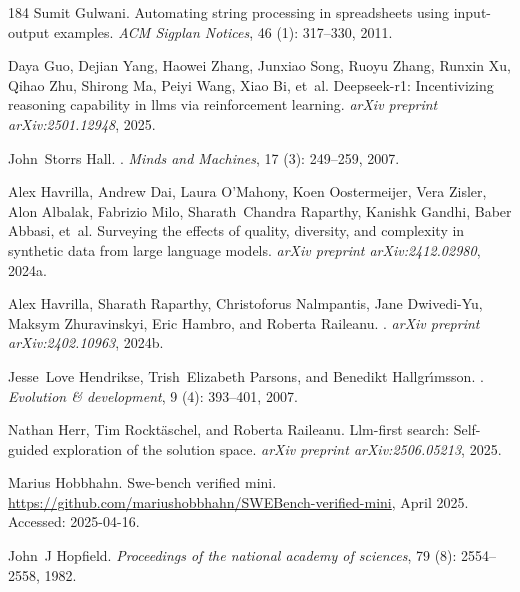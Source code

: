 \begin{thebibliography}{184}
Sumit Gulwani.
\newblock Automating string processing in spreadsheets using input-output
  examples.
\newblock \emph{ACM Sigplan Notices}, 46 (1): 317--330, 2011.

Daya Guo, Dejian Yang, Haowei Zhang, Junxiao Song, Ruoyu Zhang, Runxin Xu,
  Qihao Zhu, Shirong Ma, Peiyi Wang, Xiao Bi, et~al.
\newblock Deepseek-r1: Incentivizing reasoning capability in llms via
  reinforcement learning.
\newblock \emph{arXiv preprint arXiv:2501.12948}, 2025.

John~Storrs Hall.
.
\newblock \emph{Minds and Machines}, 17 (3): 249--259, 2007.

Alex Havrilla, Andrew Dai, Laura O'Mahony, Koen Oostermeijer, Vera Zisler, Alon
  Albalak, Fabrizio Milo, Sharath~Chandra Raparthy, Kanishk Gandhi, Baber
  Abbasi, et~al.
\newblock Surveying the effects of quality, diversity, and complexity in
  synthetic data from large language models.
\newblock \emph{arXiv preprint arXiv:2412.02980}, 2024{a}.

Alex Havrilla, Sharath Raparthy, Christoforus Nalmpantis, Jane Dwivedi-Yu,
  Maksym Zhuravinskyi, Eric Hambro, and Roberta Raileanu.
.
\newblock \emph{arXiv preprint arXiv:2402.10963}, 2024{b}.

Jesse~Love Hendrikse, Trish~Elizabeth Parsons, and Benedikt Hallgr{\'\i}msson.
.
\newblock \emph{Evolution \& development}, 9 (4): 393--401,
  2007.

Nathan Herr, Tim Rockt{\"a}schel, and Roberta Raileanu.
\newblock Llm-first search: Self-guided exploration of the solution space.
\newblock \emph{arXiv preprint arXiv:2506.05213}, 2025.

Marius Hobbhahn.
\newblock Swe-bench verified mini.
\newblock \url{https://github.com/mariushobbhahn/SWEBench-verified-mini}, April
  2025.
\newblock Accessed: 2025-04-16.

John~J Hopfield.
\newblock \emph{Proceedings of the national academy of sciences}, 79
  (8): 2554--2558, 1982.


\end{thebibliography}
